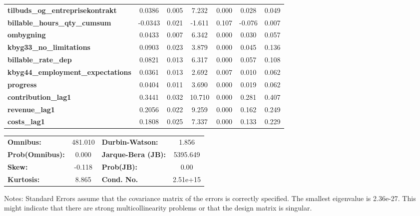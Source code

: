 \begin{center}
\begin{tabular}{lcccccc}
\textbf{tilbuds\_og\_entreprisekontrakt}  &       0.0386  &        0.005     &     7.232  &         0.000        &        0.028    &        0.049     \\
\textbf{billable\_hours\_qty\_cumsum}     &      -0.0343  &        0.021     &    -1.611  &         0.107        &       -0.076    &        0.007     \\
\textbf{ombygning}                        &       0.0433  &        0.007     &     6.342  &         0.000        &        0.030    &        0.057     \\
\textbf{kbyg33\_no\_limitations}          &       0.0903  &        0.023     &     3.879  &         0.000        &        0.045    &        0.136     \\
\textbf{billable\_rate\_dep}              &       0.0821  &        0.013     &     6.317  &         0.000        &        0.057    &        0.108     \\
\textbf{kbyg44\_employment\_expectations} &       0.0361  &        0.013     &     2.692  &         0.007        &        0.010    &        0.062     \\
\textbf{progress}                         &       0.0404  &        0.011     &     3.690  &         0.000        &        0.019    &        0.062     \\
\textbf{contribution\_lag1}               &       0.3441  &        0.032     &    10.710  &         0.000        &        0.281    &        0.407     \\
\textbf{revenue\_lag1}                    &       0.2056  &        0.022     &     9.259  &         0.000        &        0.162    &        0.249     \\
\textbf{costs\_lag1}                      &       0.1808  &        0.025     &     7.337  &         0.000        &        0.133    &        0.229     \\
\bottomrule
\end{tabular}
\begin{tabular}{lclc}
\textbf{Omnibus:}       & 481.010 & \textbf{  Durbin-Watson:     } &    1.856  \\
\textbf{Prob(Omnibus):} &   0.000 & \textbf{  Jarque-Bera (JB):  } & 5395.649  \\
\textbf{Skew:}          &  -0.118 & \textbf{  Prob(JB):          } &     0.00  \\
\textbf{Kurtosis:}      &   8.865 & \textbf{  Cond. No.          } & 2.51e+15  \\
\bottomrule
\end{tabular}
\end{center}

Notes: \newline
 [1] Standard Errors assume that the covariance matrix of the errors is correctly specified. \newline
 [2] The smallest eigenvalue is 2.36e-27. This might indicate that there are \newline
 strong multicollinearity problems or that the design matrix is singular.